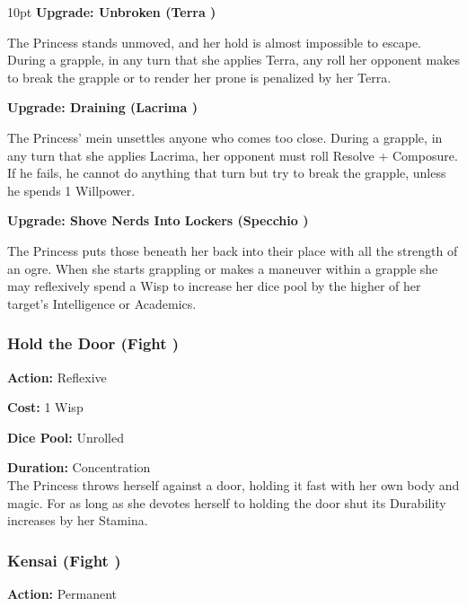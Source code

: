 \begin{myindentpar}{10pt}
\textbf{Upgrade: Unbroken (Terra \textbullet\textbullet)}

The Princess stands unmoved, and her hold is almost impossible to escape. During a grapple, in any turn that she applies Terra, any roll her opponent makes to break the grapple or to render her prone is penalized by her Terra.

\textbf{Upgrade: Draining (Lacrima \textbullet\textbullet)}

The Princess' mein unsettles anyone who comes too close. During a grapple, in any turn that she applies Lacrima, her opponent must roll Resolve + Composure. If he fails, he cannot do anything that turn but try to break the grapple, unless he spends 1 Willpower.

\textbf{Upgrade: Shove Nerds Into Lockers  (Specchio \textbullet\textbullet)}

The Princess puts those beneath her back into their place with all the strength of an ogre. When she starts grappling or makes a maneuver within a grapple she may reflexively spend a Wisp to increase her dice pool by the higher of her target's Intelligence or Academics.\end{myindentpar}

\subsubsection*{Hold the Door (Fight \textbullet)}

\noindent \textbf{Action:} Reflexive

\noindent \textbf{Cost:} 1 Wisp

\noindent \textbf{Dice Pool:} Unrolled

\noindent \textbf{Duration:} Concentration\\

The Princess throws herself against a door, holding it fast with her own body and magic. For as long as she devotes herself to holding the door shut its Durability increases by her Stamina. 

\subsubsection*{Kensai (Fight \textbullet)}

\noindent \textbf{Action:} Permanent \\

